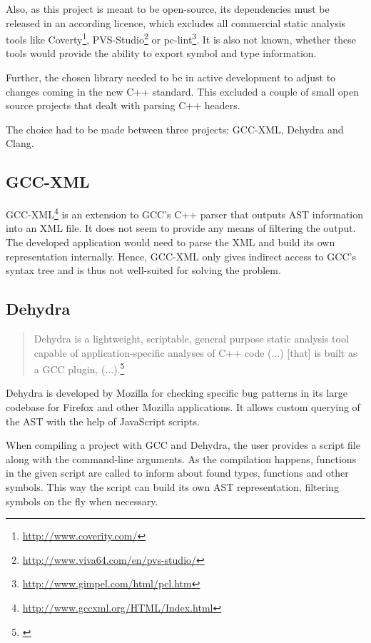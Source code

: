 Also, as this project is meant to be open-source, its dependencies must be released in an according licence, which excludes all commercial static analysis tools like Coverty\footnote{\url{http://www.coverity.com/}}, PVS-Studio\footnote{\url{http://www.viva64.com/en/pvs-studio/}} or pc-lint\footnote{\url{http://www.gimpel.com/html/pcl.htm}}. It is also not known, whether these tools would provide the ability to export symbol and type information.

Further, the chosen library needed to be in active development to adjust to changes coming in the new C++ standard. This excluded a couple of small open source projects that dealt with parsing C++ headers.

The choice had to be made between three projects: GCC-XML, Dehydra and Clang.

\subsection{GCC-XML}

GCC-XML\footnote{\url{http://www.gccxml.org/HTML/Index.html}} is an extension to GCC's C++ parser that outputs AST information into an XML file. It does not seem to provide any means of filtering the output. The developed application would need to parse the XML and build its own representation internally. Hence, GCC-XML only gives indirect access to GCC's syntax tree and is thus not well-suited for solving the problem.

\subsection{Dehydra}

\begin{quotation}
Dehydra is a lightweight, scriptable, general purpose static analysis tool capable of application-specific analyses of C++ code (...) [that] is built as a GCC plugin, (...).\footnote{\citep{MDNDehydra}}
\end{quotation}

Dehydra is developed by Mozilla for checking specific bug patterns in its large codebase for Firefox and other Mozilla applications. It allows custom querying of the AST with the help of JavaScript scripts.

When compiling a project with GCC and Dehydra, the user provides a script file along with the command-line arguments. As the compilation happens, functions in the given script are called to inform about found types, functions and other symbols. This way the script can build its own AST representation, filtering symbols on the fly when necessary.

